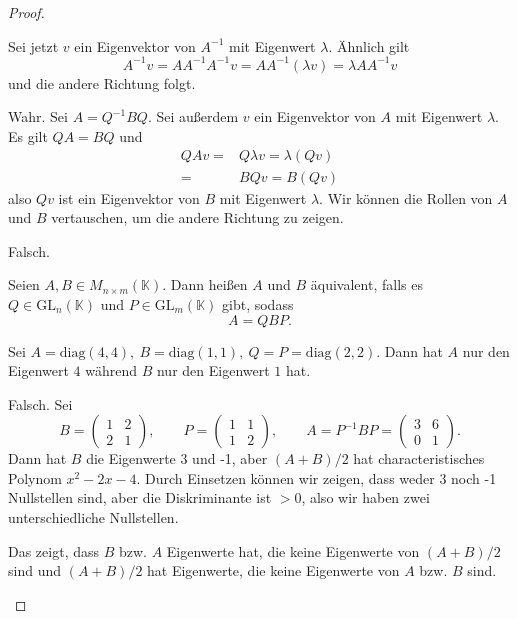 \begin{proof}
\begin{parts}
		Sei jetzt $v$ ein Eigenvektor von $A^{-1}$ mit Eigenwert $\lambda$. Ähnlich gilt
		\[
			A^{-1}v=A A^{-1}A^{-1}v=A A^{-1}(\lambda v)=\lambda A A^{-1}v
		\]
		und die andere Richtung folgt.
	\item Wahr. Sei $A=Q^{-1}BQ$. Sei außerdem $v$ ein Eigenvektor von $A$ mit Eigenwert $\lambda$. Es gilt $QA=BQ$ und
		\begin{align*}
			QAv=&Q\lambda v=\lambda(Qv)\\
			=&BQv=B(Qv)
		\end{align*}
		also $Qv$ ist ein Eigenvektor von $B$ mit Eigenwert $\lambda$. Wir können die Rollen von $A$ und $B$ vertauschen, um die andere Richtung zu zeigen. 
	\item Falsch.
		\begin{tcolorbox}[title=Definition]
			Seien $A,B\in M_{n\times m}(\mathbb{K})$. Dann heißen $A$ und $B$ äquivalent, falls es $Q\in\text{GL}_n(\mathbb{K})$ und $P\in \text{GL}_m(\mathbb{K})$ gibt, sodass
			\[
			A=QBP
			.\] 
		\end{tcolorbox}
		Sei $A=\text{diag}(4,4),~B=\text{diag}(1,1),~Q=P=\text{diag}(2,2)$. Dann hat $A$ nur den Eigenwert $4$ während $B$ nur den Eigenwert $1$ hat.
	\item Falsch. Sei
		\[
			B=\begin{pmatrix} 1 & 2 \\ 2 & 1 \end{pmatrix},\qquad P=\begin{pmatrix} 1 & 1 \\ 1 & 2 \end{pmatrix},\qquad A=P^{-1}BP=\begin{pmatrix} 3 & 6 \\ 0 & 1 \end{pmatrix} 
		.\] 
		Dann hat $B$ die Eigenwerte 3 und -1, aber $(A+B) / 2$ hat characteristisches Polynom $x^2-2x-4$. Durch Einsetzen können wir zeigen, dass weder 3 noch -1 Nullstellen sind, aber die Diskriminante ist $>0$, also wir haben zwei unterschiedliche Nullstellen.

		Das zeigt, dass $B$ bzw. $A$ Eigenwerte hat, die keine Eigenwerte von $(A+ B) / 2$ sind und $(A + B) / 2$ hat Eigenwerte, die keine Eigenwerte von $A$ bzw. $B$ sind.\qedhere
	\end{parts}
\end{proof}
